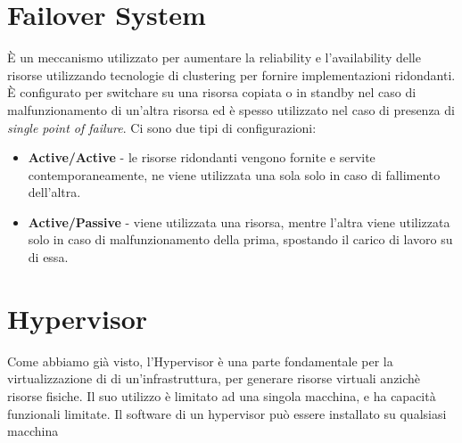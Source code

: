 \section{Failover System}
È un meccanismo utilizzato per aumentare la reliability e l'availability delle risorse utilizzando tecnologie di clustering per fornire implementazioni ridondanti. È configurato per switchare su una risorsa copiata o in standby nel caso di malfunzionamento di un'altra risorsa ed è spesso utilizzato nel caso di presenza di \textit{single point of failure}. Ci sono due tipi di configurazioni:
\begin{itemize}
    \item \textbf{Active/Active} - le risorse ridondanti vengono fornite e servite contemporaneamente, ne viene utilizzata una sola solo in caso di fallimento dell'altra.
    \item \textbf{Active/Passive} - viene utilizzata una risorsa, mentre l'altra viene utilizzata solo in caso di malfunzionamento della prima, spostando il carico di lavoro su di essa.
\end{itemize}

\section{Hypervisor}
Come abbiamo già visto, l'Hypervisor è una parte fondamentale per la virtualizzazione di di un'infrastruttura, per generare risorse virtuali anzichè risorse fisiche. Il suo utilizzo è limitato ad una singola macchina, e ha capacità funzionali limitate. Il software di un hypervisor può essere installato su qualsiasi macchina

